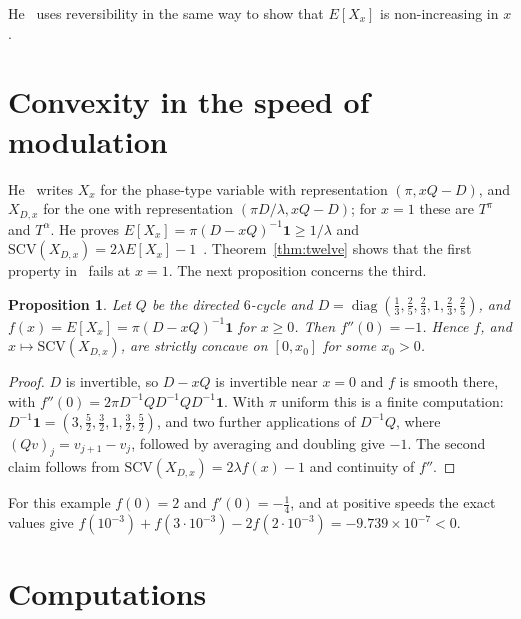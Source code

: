 \documentclass[11pt]{amsart}
\newtheorem{proposition}[theorem]{Proposition}
\theoremstyle{remark}
\newcommand{\one}{\mathbf 1}
\begin{document}
He~\cite[Theorem~3.4]{He} uses reversibility in the same way to show that $E[X_x]$ is non-increasing in $x$.

\section{Convexity in the speed of modulation}

He~\cite{He} writes $X_x$ for the phase-type variable with representation $(\pi,xQ-D)$, and $X_{D,x}$ for the one with representation $(\pi D/\lambda,xQ-D)$; for $x=1$ these are $T^\pi$ and $T^\alpha$. He proves $E[X_x]=\pi(D-xQ)^{-1}\one\ge1/\lambda$ and $\mathrm{SCV}(X_{D,x})=2\lambda E[X_x]-1$~\cite[Theorems~3.1 and~3.2]{He}. Theorem~\ref{thm:twelve} shows that the first property in~\cite[Section~4.3]{He} fails at $x=1$. The next proposition concerns the third.

\begin{proposition}\label{prop:convex}
Let $Q$ be the directed $6$-cycle and $D=\operatorname{diag}(\tfrac13,\tfrac25,\tfrac23,1,\tfrac23,\tfrac25)$, and $f(x)=E[X_x]=\pi(D-xQ)^{-1}\one$ for $x\ge0$. Then $f''(0)=-1$. Hence $f$, and $x\mapsto\mathrm{SCV}(X_{D,x})$, are strictly concave on $[0,x_0]$ for some $x_0>0$.
\end{proposition}

\begin{proof}
$D$ is invertible, so $D-xQ$ is invertible near $x=0$ and $f$ is smooth there, with $f''(0)=2\pi D^{-1}QD^{-1}QD^{-1}\one$. With $\pi$ uniform this is a finite computation: $D^{-1}\one=(3,\tfrac52,\tfrac32,1,\tfrac32,\tfrac52)$, and two further applications of $D^{-1}Q$, where $(Qv)_j=v_{j+1}-v_j$, followed by averaging and doubling give $-1$. The second claim follows from $\mathrm{SCV}(X_{D,x})=2\lambda f(x)-1$ and continuity of $f''$.
\end{proof}

For this example $f(0)=2$ and $f'(0)=-\tfrac14$, and at positive speeds the exact values give $f(10^{-3})+f(3\cdot10^{-3})-2f(2\cdot10^{-3})=-9.739\times10^{-7}<0$.

\section{Computations}\label{sec:checks}
\end{document}
